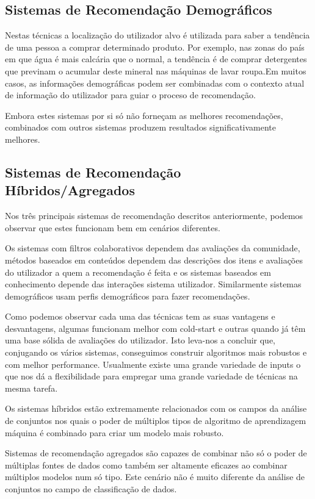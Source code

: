 \subsection{Sistemas de Recomendação Demográficos}
\par\hfill
\par Nestas técnicas a localização do utilizador alvo é utilizada para saber a tendência de uma pessoa a comprar determinado produto. Por exemplo, nas zonas do país em que água é mais calcária que o normal, a tendência é de comprar detergentes que previnam o acumular deste mineral nas máquinas de lavar roupa.Em muitos casos, as informações demográficas podem ser combinadas com o contexto atual de informação do utilizador para guiar o proceso de recomendação.
\par Embora estes sistemas por si só não forneçam as melhores recomendações, combinados com outros sistemas produzem resultados significativamente melhores.


\subsection{Sistemas de Recomendação Híbridos/Agregados}
\par\hfill
 \par Nos três principais sistemas de recomendação descritos anteriormente, podemos observar que estes funcionam bem em cenários diferentes. 
 \par Os sistemas com filtros colaborativos dependem das avaliações da comunidade, métodos baseados em conteúdos dependem das descrições dos itens e avaliações do utilizador a quem a recomendação é feita e os sistemas baseados em conhecimento depende das interações sistema utilizador. Similarmente sistemas demográficos usam perfis demográficos para fazer recomendações.
 \par Como podemos observar cada uma das técnicas tem as suas vantagens e desvantagens, algumas funcionam melhor com cold-start e outras quando já têm uma base sólida de avaliações do utilizador. Isto leva-nos a concluir que, conjugando os vários sistemas, conseguimos construir algoritmos mais robustos e com melhor performance. Usualmente existe uma grande variedade de inputs o que nos dá a flexibilidade para empregar uma grande variedade de técnicas na mesma tarefa.
 \par Os sistemas híbridos estão extremamente relacionados com os campos da análise de conjuntos nos quais o poder de múltiplos tipos de algoritmo de aprendizagem máquina é combinado para criar um modelo mais robusto.
 \par Sistemas de recomendação agregados são capazes de combinar não só o poder de múltiplas fontes de dados como também ser altamente eficazes ao combinar múltiplos modelos num só tipo. Este cenário não é muito diferente da análise de conjuntos no campo de classificação de dados.


